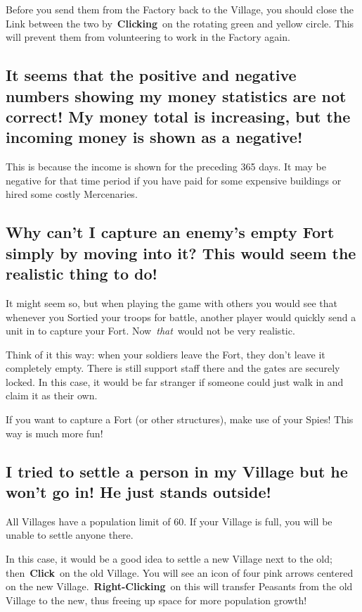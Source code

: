 Before you send them from the Factory back to the Village, you should close the Link between the two by \textbf{Clicking} on the rotating green and yellow circle. This will prevent them from volunteering to work in the Factory again.

\subsection{It seems that the positive and negative numbers showing my money statistics are not correct! My money total is increasing, but the incoming money is shown as a negative!}

This is because the income is shown for the preceding 365 days. It may be negative for that time period if you have paid for some expensive buildings or hired some costly Mercenaries.

\subsection{Why can’t I capture an enemy’s empty Fort simply by moving into it? This would seem the realistic thing to do!}

It might seem so, but when playing the game with others you would see that whenever you Sortied your troops for battle, another player would quickly send a unit in to capture your Fort. Now \textit{that} would not be very realistic.

Think of it this way: when your soldiers leave the Fort, they don’t leave it completely empty. There is still support staff there and the gates are securely locked. In this case, it would be far stranger if someone could just walk in and claim it as their own.

If you want to capture a Fort (or other structures), make use of your Spies! This way is much more fun!

\subsection{I tried to settle a person in my Village but he won’t go in! He just stands outside!}

All Villages have a population limit of 60. If your Village is full, you will be unable to settle anyone there.

In this case, it would be a good idea to settle a new Village next to the old; then \textbf{Click} on the old Village. You will see an icon of four pink arrows centered on the new Village. \textbf{Right-Clicking} on this will transfer Peasants from the old Village to the new, thus freeing up space for more population growth!

